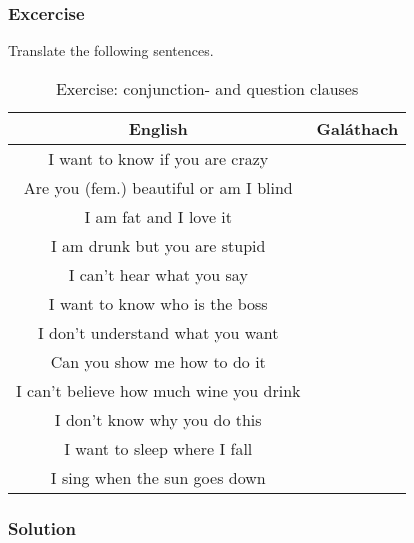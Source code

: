 \subsubsection{Excercise}

Translate the following sentences.

\begin{table}[H]
\centering
\begin{tabular}{|c|M{5.0cm}|}
  \toprule
  \textbf{English} & \textbf{Gal\'{a}thach}\\
  \toprule
  I want to know if you are crazy & \\
  \midrule
  Are you (fem.) beautiful or am I blind & \\
  \midrule
  I am fat and I love it & \\
  \midrule
  I am drunk but you are stupid & \\
  \midrule
  I can't hear what you say & \\
  \midrule
  I want to know who is the boss & \\
  \midrule
  I don't understand what you want & \\
  \midrule
  Can you show me how to do it & \\
  \midrule
  I can't believe how much wine you drink & \\
  \midrule
  I don't know why you do this & \\
  \midrule
  I want to sleep where I fall & \\
  \midrule
  I sing when the sun goes down & \\
  \bottomrule
\end{tabular}
\label{exercise_conjunction_and_question_clauses}
\caption{Exercise: conjunction- and question clauses}
\end{table}


\newpage
\subsubsection{Solution}

